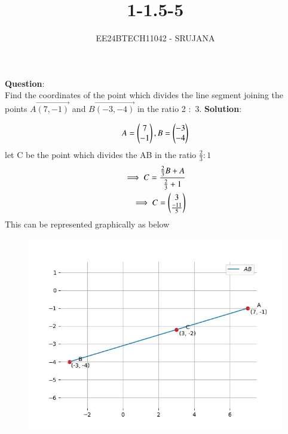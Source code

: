 \documentclass[journal]{IEEEtran}
\begin{document}

\vspace{3cm}

\title{1-1.5-5}
\author{EE24BTECH11042 - SRUJANA}
{\let\newpage\relax\maketitle}

\renewcommand{\thefigure}{\theenumi}
\renewcommand{\thetable}{\theenumi}
\setlength{\intextsep}{10pt} %


\renewcommand{\thetable}{\theenumi}


\textbf{Question}:\\
Find the coordinates of the point which divides the line segment joining the points  $A\vec{(7,-1)}$  and $B\vec{(-3,-4)}$ in the ratio 2 $:$ 3.
\textbf{Solution}:\\
\begin{table}[h!]
	\centering
	
	\label{tab1-1.5-5}
\end{table}
\begin{align}
	A=\begin{pmatrix}7\\-1\end{pmatrix} , B=\begin{pmatrix}-3\\-4\end{pmatrix}
\end{align}
let C be the point which divides the AB in the ratio $\frac{2}{3} : 1$
\begin{align}
	\implies C=\frac{\frac{2}{3}B+A}{\frac{2}{3}+1}\\
	\implies C=\begin{pmatrix}3\\\frac{-11}{5}\\\end{pmatrix}
\end{align}
This can be represented graphically as below
\begin{figure}[h!]
   \centering
   \includegraphics[width=0.7\linewidth]{figs/fig.jpg}
\end{figure}
\end{document}
